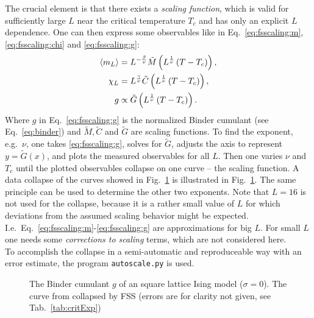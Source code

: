     The crucial element is that there exists a \emph{scaling function},
    which is valid for sufficiently large \(L\) near the critical
    temperature \(T_{c}\) and has only an explicit \(L\) dependence.
    One can then express some observables like in Eq.\ \eqref{eq:fsscaling:m}, \eqref{eq:fsscaling:chi} and
    \eqref{eq:fsscaling:g}:
    \begin{align}
        \label{eq:fsscaling:m}
        \left< m_L \right> &= L^{-\frac{\beta}{\nu}} \tilde{M}\left(L^\frac{1}{\nu}\left(T-T_c\right)\right),\\
        \label{eq:fsscaling:chi}
        \chi_L    &= L^{\frac{\gamma}{\nu}} \tilde{C}\left(L^\frac{1}{\nu}\left(T-T_c\right)\right),\\
        \label{eq:fsscaling:g}
        g         &\propto \tilde{G}\left(L^\frac{1}{\nu}\left(T-T_c\right)\right).
    \end{align}
    Where \(g\) in Eq.\ \eqref{eq:fsscaling:g} is the normalized
    Binder cumulant (see Eq.\ \eqref{eq:binder}) and \(\tilde{M}, \tilde{C}\) and \(\tilde{G}\)
    are scaling functions.
    To find the exponent, e.g.\ \(\nu\), one takes \eqref{eq:fsscaling:g},
    solves for \(\tilde{G}\), adjusts the axis to represent \(y=\tilde{G}(x)\),
    and plots the measured observables for all \(L\).
    Then one varies \(\nu\) and \(T_{c}\) until the plotted observables
    collapse on one curve -- the scaling function.
    A data collapse of the curves showed in Fig.\ \ref{fig:gettingCrit}
    is illustrated in Fig.\ \ref{fig:gettingCrit}.
    The same principle can be used to determine the other two exponents.
    Note that \(L=16\) is not used for the collapse, because it is a
    rather small value of \(L\) for which deviations from the assumed
    scaling behavior might be expected. I.e.\ Eq.\ \eqref{eq:fsscaling:m}-\eqref{eq:fsscaling:g}
    are approximations for big \(L\). For small \(L\) one needs some
    \emph{corrections to scaling} terms, which are not considered here.\\
    To accomplish the collapse in a semi-automatic and reproduceable
    way with an error estimate, the program
    \texttt{autoscale.py} \cite{autoscale2009} is used.
    \begin{figure}[htbp]
        \centering
        \caption[Examples of Determining Critical Temperature and Exponents]
        {
             The Binder cumulant \(g\)
                of an square lattice Ising model (\(\sigma=0\)).
             The curve from 
                collapsed by FSS (errors are for clarity
                not given, see Tab.\ \ref{tab:critExp})
        }
        \label{fig:gettingCrit}
    \end{figure}\\
